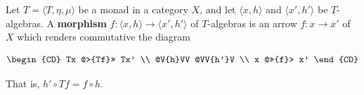Let $T = \langle T, \eta, \mu \rangle$ be a monad in a category $X$, and let
$\langle x, h \rangle$ and $\langle x', h' \rangle$ be $T$-algebras.
A \textbf{morphism} $f: \langle x, h \rangle \to \langle x', h' \rangle$ of $T$-algebras is
an arrow $f: x \to x'$ of $X$ which renders commutative the diagram

\[
\begin{CD}
Tx @>{Tf}>> Tx' \\
@V{h}VV @VV{h'}V \\
x @>>{f}> x'
\end{CD}
\]

That is, $h' \circ Tf = f \circ h$.
